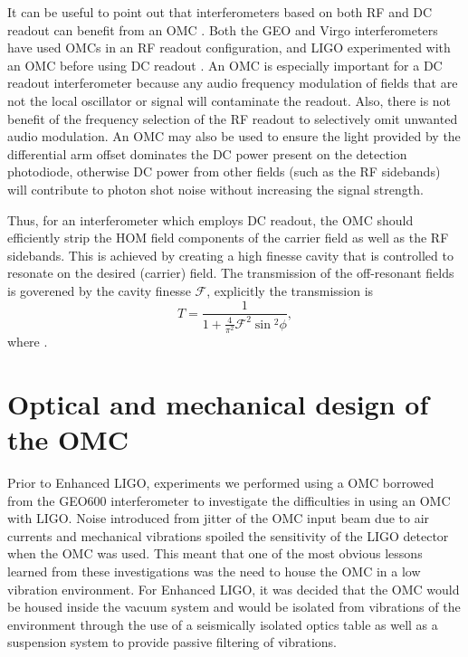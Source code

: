 It can be useful to point out that interferometers based on both RF and DC readout can benefit from an OMC . %
Both the GEO and Virgo interferometers have used OMCs in an RF readout configuration, and LIGO experimented with an OMC before using DC readout \cite{some things}. %
An OMC is especially important for a DC readout interferometer because any audio frequency modulation of fields that are not the local oscillator or signal will contaminate the readout. %
Also, there is not benefit of the frequency selection of the RF readout to selectively omit unwanted audio modulation. %
An OMC may also be used to ensure the light provided by the differential arm offset dominates the DC power present on the detection photodiode, otherwise DC power from other fields (such as the RF sidebands) will contribute to photon shot noise without increasing the signal strength. %


Thus, for an interferometer which employs DC readout, the OMC should efficiently strip the HOM field components of the carrier field as well as the RF sidebands. %
This is achieved by creating a high finesse cavity that is controlled to resonate on the desired (carrier) field. %
The transmission of the off-resonant fields is goverened by the cavity finesse $\mathcal{F}$, explicitly the transmission is
\begin{equation}
\label{eqn:finesse}
T=\frac{1}{1+\frac{4}{\pi^2}\mathcal{F}^2\sin{}^2\phi},
\end{equation}
where .

\section{Optical and mechanical design of the OMC}
Prior to Enhanced LIGO, experiments we performed using a OMC borrowed from the GEO600 interferometer to investigate the difficulties in using an OMC with LIGO. %
Noise introduced from jitter of the OMC input beam due to air currents and mechanical vibrations spoiled the sensitivity of the LIGO detector when the OMC was used. %
This meant that one of the most obvious lessons learned from these investigations was the need to house the OMC in a low vibration environment. %
For Enhanced LIGO, it was decided that the OMC would be housed inside the vacuum system and would be isolated from vibrations of the environment through the use of a seismically isolated optics table as well as a suspension system to provide passive filtering of vibrations.

